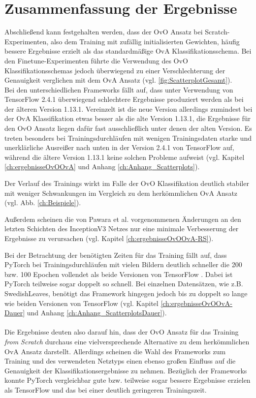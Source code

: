 \section{Zusammenfassung der Ergebnisse}
Abschließend kann festgehalten werden, dass der OvO Ansatz bei Scratch-Experimenten, also dem Training mit zufällig initialisierten Gewichten, häufig bessere Ergebnisse erzielt als das standardmäßige OvA Klassifikationsschema. Bei den Finetune-Experimenten führte die Verwendung des OvO Klassifikationsschemas jedoch überwiegend zu einer Verschlechterung der Genauigkeit verglichen mit dem OvA Ansatz (vgl. \ref{fig:ScatterplotGesamt}).\\

Bei den unterschiedlichen Frameworks fällt auf, dass unter Verwendung von TensorFlow \cite{tensorflow} 2.4.1 überwiegend schlechtere Ergebnisse produziert werden als bei der älteren Version 1.13.1. Vereinzelt ist die neue Version allerdings zumindest bei der OvA Klassifikation etwas besser als die alte Version 1.13.1, die Ergebnisse für den OvO Ansatz liegen dafür fast ausschließlich unter denen der alten Version. Es treten besonders bei Trainingsdurchläufen mit wenigen Trainingsdaten starke und unerklärliche Ausreißer nach unten in der Version 2.4.1 von TensorFlow \cite{tensorflow} auf, während die ältere Version 1.13.1 keine solchen Probleme aufweist (vgl. Kapitel \ref{ch:ergebnisseOvOOvA} und Anhang \ref{ch:Anhang_Scatterplots}).

Der Verlauf des Trainings wirkt im Falle der OvO Klassifikation deutlich stabiler mit weniger Schwankungen im Vergleich zu dem herkömmlichen OvA Ansatz (vgl. Abb. \ref{ch:Beispiele}).

Außerdem scheinen die von Pawara et al. \cite{pawaraWebsiteCode} vorgenommenen Änderungen an den letzten Schichten des InceptionV3 Netzes nur eine minimale Verbesserung der Ergebnisse zu verursachen (vgl. Kapitel \ref{ch:ergebnisseOvOOvA-RS}).

Bei der Betrachtung der benötigten Zeiten für das Training fällt auf, dass PyTorch \cite{pytorch} bei Trainingsdurchläufen mit vielen Bildern deutlich schneller die 200 bzw. 100 Epochen vollendet als beide Versionen von TensorFlow \cite{tensorflow}. Dabei ist PyTorch \cite{pytorch} teilweise sogar doppelt so schnell. Bei einzelnen Datensätzen, wie z.B. SwedishLeaves, benötigt das Framework hingegen jedoch bis zu doppelt so lange wie beiden Versionen von TensorFlow \cite{tensorflow} (vgl. Kapitel \ref{ch:ergebnisseOvOOvA-Dauer} und Anhang \ref{ch:Anhang_ScatterplotsDauer}).\\\\

Die Ergebnisse deuten also darauf hin, dass der OvO Ansatz für das Training \textit{from Scratch} durchaus eine vielversprechende Alternative zu dem herkömmlichen OvA Ansatz darstellt. Allerdings scheinen die Wahl des Frameworks zum Training und des verwendeten Netztyps einen ebenso großen Einfluss auf die Genauigkeit der Klassifikationsergebnisse zu nehmen. Bezüglich der Frameworks konnte PyTorch \cite{pytorch} vergleichbar gute bzw. teilweise sogar bessere Ergebnisse erzielen als TensorFlow \cite{tensorflow} und das bei einer deutlich geringeren Trainingszeit.